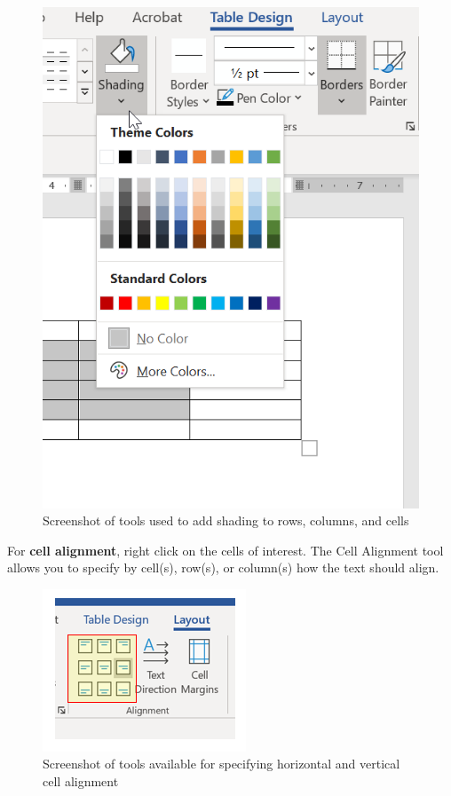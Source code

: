 \documentclass[
  english,
]{book}
\begin{document}
\begin{figure}
\centering
\includegraphics{images/TableMagic/Borders.png}
\caption{Screenshot of tools used to add shading to rows, columns, and cells}
\end{figure}

For \textbf{cell alignment}, right click on the cells of interest. The Cell Alignment tool allows you to specify by cell(s), row(s), or column(s) how the text should align.

\begin{figure}
\centering
\includegraphics{images/TableMagic/CellAlignment.png}
\caption{Screenshot of tools available for specifying horizontal and vertical cell alignment}
\end{figure}
\end{document}

